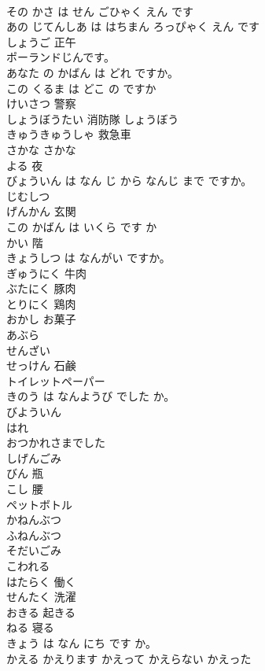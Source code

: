 \documentclass[8pt]{extreport}
\begin{document}
\begin{CJK}{UTF8}{min}
\\	その かさ は せん ごひゃく えん です	
\\	あの じてんしあ は はちまん ろっぴゃく えん です	
\\	しょうご	正午
\\	ポーランドじんです。	
\\	あなた の かばん は どれ ですか。	
\\	この くるま は どこ の ですか	
\\	けいさつ	警察
\\	しょうぼうたい	消防隊 しょうぼう
\\	きゅうきゅうしゃ	救急車
\\	さかな	さかな
\\	よる	夜
\\	びょういん は なん じ から なんじ まで ですか。	
\\	じむしつ	
\\	げんかん	玄関
\\	この かばん は いくら です か	
\\	かい	階
\\	きょうしつ は なんがい ですか。	
\\	ぎゅうにく	牛肉
\\	ぶたにく	豚肉
\\	とりにく	鶏肉
\\	おかし	お菓子
\\	あぶら	
\\	せんざい	
\\	せっけん	石鹸
\\	トイレットペーパー	
\\	きのう は なんようび でした か。	
\\	びよういん	
\\	はれ	
\\	おつかれさまでした	
\\	しげんごみ	
\\	びん	瓶
\\	こし	腰
\\	ペットボトル	
\\	かねんぶつ	
\\	ふねんぶつ	
\\	そだいごみ	
\\	こわれる	
\\	はたらく	働く
\\	せんたく	洗濯
\\	おきる	起きる
\\	ねる	寝る
\\	きょう は なん にち です か。	
\\	かえる	かえります	かえって	かえらない	かえった	

\end{CJK}
\end{document}

